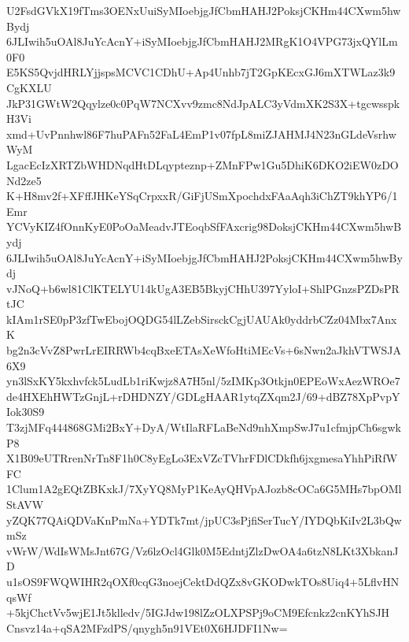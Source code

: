 U2FsdGVkX19fTms3OENxUuiSyMIoebjgJfCbmHAHJ2PoksjCKHm44CXwm5hwBydj
6JLIwih5uOAl8JuYcAcnY+iSyMIoebjgJfCbmHAHJ2MRgK1O4VPG73jxQYlLm0F0
E5KS5QvjdHRLYjjspsMCVC1CDhU+Ap4Unhb7jT2GpKEcxGJ6mXTWLaz3k9CgKXLU
JkP31GWtW2Qqylze0c0PqW7NCXvv9zmc8NdJpALC3yVdmXK2S3X+tgcwsspkH3Vi
xmd+UvPnnhwl86F7huPAFn52FaL4EmP1v07fpL8miZJAHMJ4N23nGLdeVsrhwWyM
LgacEcIzXRTZbWHDNqdHtDLqypteznp+ZMnFPw1Gu5DhiK6DKO2iEW0zDONd2ze5
K+H8mv2f+XFffJHKeYSqCrpxxR/GiFjUSmXpochdxFAaAqh3iChZT9khYP6/1Emr
YCVyKIZ4fOnnKyE0PoOaMeadvJTEoqbSfFAxcrig98DoksjCKHm44CXwm5hwBydj
6JLIwih5uOAl8JuYcAcnY+iSyMIoebjgJfCbmHAHJ2PoksjCKHm44CXwm5hwBydj
vJNoQ+b6wl81ClKTELYU14kUgA3EB5BkyjCHhU397YyloI+ShlPGnzsPZDsPRtJC
kIAm1rSE0pP3zfTwEbojOQDG54lLZebSirsckCgjUAUAk0yddrbCZz04Mbx7AnxK
bg2n3cVvZ8PwrLrEIRRWb4cqBxeETAsXeWfoHtiMEcVs+6sNwn2aJkhVTWSJA6X9
yn3lSxKY5kxhvfck5LudLb1riKwjz8A7H5nl/5zIMKp3Otkjn0EPEoWxAezWROe7
de4HXEhHWTzGnjL+rDHDNZY/GDLgHAAR1ytqZXqm2J/69+dBZ78XpPvpYIok30S9
T3zjMFq444868GMi2BxY+DyA/WtIlaRFLaBeNd9nhXmpSwJ7u1cfmjpCh6sgwkP8
X1B09eUTRrenNrTn8F1h0C8yEgLo3ExVZcTVhrFDlCDkfh6jxgmesaYhhPiRfWFC
1Clum1A2gEQtZBKxkJ/7XyYQ8MyP1KeAyQHVpAJozb8cOCa6G5MHs7bpOMlStAVW
yZQK77QAiQDVaKnPmNa+YDTk7mt/jpUC3sPjfiSerTucY/IYDQbKiIv2L3bQwmSz
vWrW/WdIsWMsJnt67G/Vz6lzOcl4Glk0M5EdntjZlzDwOA4a6tzN8LKt3XbkanJD
u1sOS9FWQWIHR2qOXf0cqG3noejCektDdQZx8vGKODwkTOs8Uiq4+5LflvHNqsWf
+5kjChctVv5wjE1Jt5klledv/5IGJdw198lZzOLXPSPj9oCM9Efcnkz2cnKYhSJH
Cnsvz14a+qSA2MFzdPS/qnygh5n91VEt0X6HJDFI1Nw=
